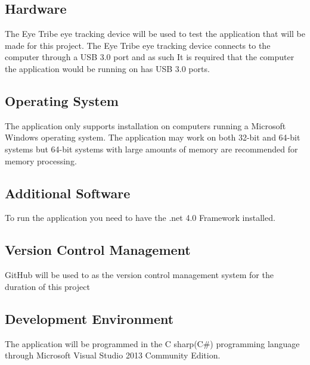 \subsection{Hardware}
The Eye Tribe eye tracking device will be used to test the application that will be made for this project. The Eye Tribe eye tracking device  connects to the computer through a USB 3.0 port and as such It is required that the computer the application would be running on has USB 3.0 ports. 
\subsection{Operating System}
The application only supports installation on computers running a Microsoft Windows operating system. The application may work on both 32-bit and 64-bit systems but 64-bit systems with large amounts of memory are recommended for memory processing. 
\subsection{Additional Software}
To run the application you need to have the .net 4.0 Framework installed.
\subsection{Version Control Management}
GitHub will be used to as the version control management system for the duration of this project
\subsection{Development Environment}
The application will be programmed in the C sharp(C\#) programming language through Microsoft Visual Studio 2013 Community Edition.
